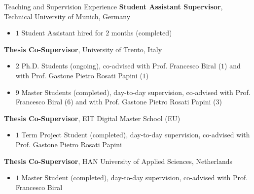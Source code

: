 \begin{rubric}{Teaching and Supervision Experience}
	\textbf{Student Assistant Supervisor}, Technical University of Munich, Germany
    \vspace{-0.3cm}
    \begin{itemize}
        \item $1$ Student Assistant hired for $2$ months (completed)
    \end{itemize}
%
\entry*[2019 -- present]%
	\textbf{Thesis Co-Supervisor}, University of Trento, Italy
    \vspace{-0.3cm}
    \begin{itemize}
        \item $2$ Ph.D. Students (ongoing), co-advised with Prof. Francesco Biral ($1$) and with Prof. Gastone Pietro Rosati Papini ($1$) \vspace{-0.35cm}
        \item $9$ Master Students (completed), day-to-day supervision, co-advised with Prof. Francesco Biral ($6$) and with Prof. Gastone Pietro Rosati Papini ($3$) 
    \end{itemize}
%
\entry*[2021 -- 2022]%
	\textbf{Thesis Co-Supervisor}, EIT Digital Master School (EU)
    \vspace{-0.3cm}
    \begin{itemize}
        \item $1$ Term Project Student (completed), day-to-day supervision, co-advised with Prof. Gastone Pietro Rosati Papini
    \end{itemize}
%
\entry*[2020 -- 2021]%
    \textbf{Thesis Co-Supervisor}, HAN University of Applied Sciences, Netherlands
    \vspace{-0.3cm}
    \begin{itemize}
        \item $1$ Master Student (completed), day-to-day supervision, co-advised with Prof. Francesco Biral
    \end{itemize}
\end{rubric}
